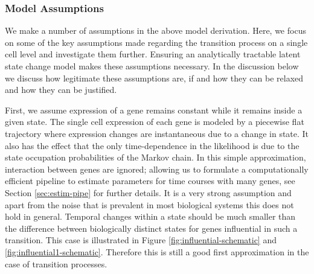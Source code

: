 \subsubsection{Model Assumptions}
\label{sec:model-assumptions}

We make a number of assumptions in the above model derivation. Here, we focus on some of the key assumptions made regarding the transition process on a single cell level and investigate them further. Ensuring an analytically tractable latent state change model makes these assumptions necessary. In the discussion below we discuss how legitimate these assumptions are, if and how they can be relaxed and how they can be justified.

First, we assume expression of a gene remains constant while it remains inside a given state. The single cell expression of each gene is modeled by a piecewise flat trajectory where expression changes are instantaneous due to a change in state. It also has the effect that the only time-dependence in the likelihood is due to the state occupation probabilities of the Markov chain. In this simple approximation, interaction between genes are ignored; allowing us to formulate a computationally efficient pipeline to estimate parameters for time courses with many genes, see Section \ref{sec:estim-pipe} for further details. It is a very strong assumption and apart from the noise that is prevalent in most biological systems
this does not hold in general. Temporal changes within a state should be much smaller than the difference between biologically distinct states for genes influential in such a transition. This case is illustrated in Figure \ref{fig:influential-schematic} and \ref{fig:influential1-schematic}. Therefore this is still a good first approximation in the case of transition processes. 

